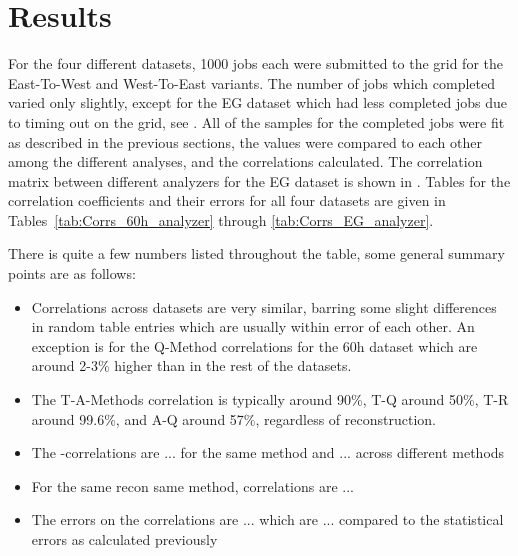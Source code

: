 
\graphicspath{{Body/Figures/Correlations/}}

\clearpage
\section{Results}

For the four different datasets, 1000 jobs each were submitted to the grid for the East-To-West and West-To-East variants. The number of jobs which completed varied only slightly, except for the EG dataset which had less completed jobs due to timing out on the grid, see . All of the samples for the completed jobs were fit as described in the previous sections, the \R values were compared to each other among the different analyses, and the correlations calculated. The correlation matrix between different analyzers for the EG dataset is shown in . Tables for the correlation coefficients and their errors for all four datasets are given in Tables~\ref{tab:Corrs_60h_analyzer} through \ref{tab:Corrs_EG_analyzer}. 


There is quite a few numbers listed throughout the table, some general summary points are as follows: 
\begin{itemize}
	\item{Correlations across datasets are very similar, barring some slight differences in random table entries which are usually within error of each other. An exception is for the Q-Method correlations for the 60h dataset which are around 2-3\% higher than in the rest of the datasets.}
	\item{The T-A-Methods correlation is typically around 90\%, T-Q around 50\%, T-R around 99.6\%, and A-Q around 57\%, regardless of reconstruction.}
	\item{The \RE-\RW correlations are ... for the same method and  ... across different methods}
	\item{For the same recon same method, correlations are ...}
	\item{The errors on the correlations are ... which are ... compared to the statistical errors as calculated previously}


\end{itemize}








